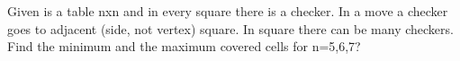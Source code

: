 Given is a table nxn and in every square there is a checker. In a move a checker goes to adjacent (side, not vertex)  square. In square there can be many checkers. Find the minimum and the maximum covered cells for n=5,6,7?